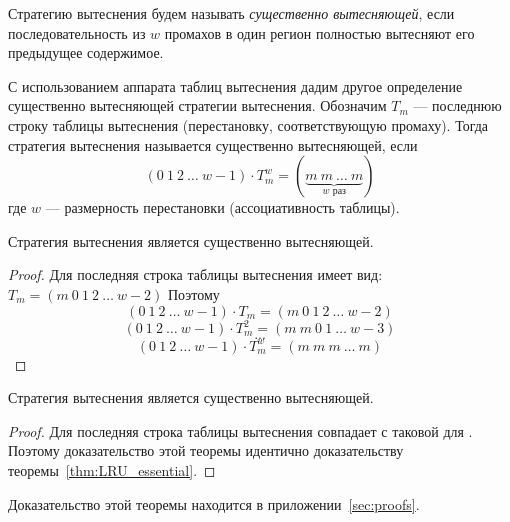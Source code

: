 Стратегию вытеснения будем называть \emph{существенно вытесняющей}, если последовательность из $w$ промахов в один регион полностью вытесняют его предыдущее содержимое.

С использованием аппарата таблиц вытеснения дадим другое определение существенно вытесняющей стратегии вытеснения. Обозначим $T_m$ --- последнюю строку таблицы вытеснения (перестановку, соответствующую промаху). Тогда стратегия вытеснения называется существенно вытесняющей, если $$(0~1~2~\dots~w{-}1) \cdot T_m^w = (\underbrace{m~m~\dots~m}_{\mbox{$w$~раз}})$$ где $w$ --- размерность перестановки (ассоциативность таблицы).

\begin{theorem}\label{thm:LRU_essential}
  Стратегия вытеснения \LRU является существенно вытесняющей.
\end{theorem}
\begin{proof}
  Для \LRU последняя строка таблицы вытеснения имеет вид: $T_m = (m~0~1~2~\dots~w{-}2)$ Поэтому
  $$(0~1~2~\dots~w{-}1) \cdot T_m = (m~0~1~2~\dots~w{-}2)$$
  $$(0~1~2~\dots~w{-}1) \cdot T_m^2 = (m~m~0~1~\dots~w{-}3)$$
  $$\mbox{...}$$
  $$(0~1~2~\dots~w{-}1) \cdot T_m^w = (m~m~m~\dots~m)$$
\end{proof}

\begin{theorem}
  Стратегия вытеснения \FIFO является существенно вытесняющей.
\end{theorem}
\begin{proof}
  Для \FIFO последняя строка таблицы вытеснения совпадает с таковой для \LRU. Поэтому доказательство этой теоремы идентично доказательству теоремы~\ref{thm:LRU_essential}.
\end{proof}

\begin{theorem}\label{thm:PseudoLRU_essential} \PseudoLRUEssential \end{theorem}

Доказательство этой теоремы находится в приложении~\ref{sec:proofs}.

